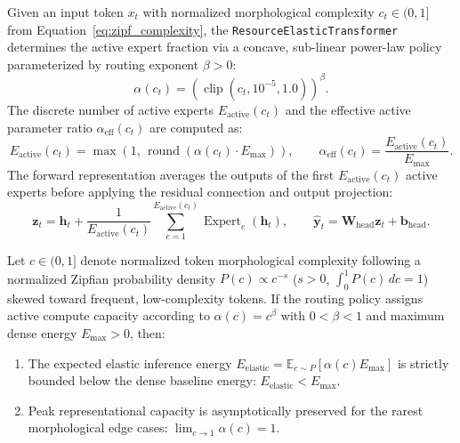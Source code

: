 \documentclass{interact}
\begin{document}
Given an input token $x_t$ with normalized morphological complexity $c_t \in (0, 1]$ from Equation~\eqref{eq:zipf_complexity}, the \texttt{ResourceElasticTransformer} determines the active expert fraction via a concave, sub-linear power-law policy parameterized by routing exponent $\beta > 0$:
\begin{equation}
    \alpha(c_t) = \left(\operatorname{clip}(c_t, 10^{-5}, 1.0)\right)^{\beta}.
    \label{eq:routing_policy}
\end{equation}
The discrete number of active experts $E_{\text{active}}(c_t)$ and the effective active parameter ratio $\alpha_{\text{eff}}(c_t)$ are computed as:
\begin{equation}
    E_{\text{active}}(c_t) = \max\left(1, \, \operatorname{round}\left(\alpha(c_t) \cdot E_{\max}\right)\right), \qquad \alpha_{\text{eff}}(c_t) = \frac{E_{\text{active}}(c_t)}{E_{\max}}.
    \label{eq:active_experts}
\end{equation}
The forward representation averages the outputs of the first $E_{\text{active}}(c_t)$ active experts before applying the residual connection and output projection:
\begin{equation}
    \mathbf{z}_t = \mathbf{h}_t + \frac{1}{E_{\text{active}}(c_t)} \sum_{e=1}^{E_{\text{active}}(c_t)} \operatorname{Expert}_e(\mathbf{h}_t), \qquad \hat{\mathbf{y}}_t = \mathbf{W}_{\text{head}} \mathbf{z}_t + \mathbf{b}_{\text{head}}.
    \label{eq:ret_forward}
\end{equation}

\begin{lemma}
    \label{lem:routing}
    Let $c \in (0, 1]$ denote normalized token morphological complexity following a normalized Zipfian probability density $P(c) \propto c^{-s}$ ($s > 0$, $\int_0^1 P(c)\,dc = 1$) skewed toward frequent, low-complexity tokens. If the routing policy assigns active compute capacity according to $\alpha(c) = c^{\beta}$ with $0 < \beta < 1$ and maximum dense energy $E_{\max} > 0$, then:
    \begin{enumerate}
        \item The expected elastic inference energy $E_{\text{elastic}} = \mathbb{E}_{c \sim P}[\alpha(c) E_{\max}]$ is strictly bounded below the dense baseline energy: $E_{\text{elastic}} < E_{\max}$.
        \item Peak representational capacity is asymptotically preserved for the rarest morphological edge cases: $\lim_{c \to 1} \alpha(c) = 1$.
    \end{enumerate}
\end{lemma}
\end{document}
